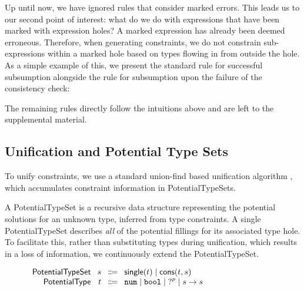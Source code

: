 Up until now, we have ignored rules that consider marked errors. This leads us to our second point of interest: what do we do with expressions that have been marked with expression holes? A marked expression has already been deemed erroneous. Therefore, when generating constraints, we do not constrain sub-expressions within a marked hole based on types flowing in from outside the hole. As a simple example of this, we present the standard rule for successful subsumption alongside the rule for subsumption upon the failure of the consistency check:

\begin{mathpar}
  
\end{mathpar}

The remaining rules directly follow the intuitions above and are left to the supplemental material.

\subsection{Unification and Potential Type Sets}
\label{sec:unification}

To unify constraints, we use a standard union-find based unification algorithm \cite{Huet, GradualInfer}, which accumulates constraint information in \textsf{PotentialTypeSet}s.

A \textsf{PotentialTypeSet} is a recursive data structure representing the potential solutions for an unknown type, inferred from type constraints. A single \textsf{PotentialTypeSet} describes \emph{all} of the potential fillings for its associated type hole. To facilitate this, rather than  substituting types during unification, which results in a loss of information, we continuously extend the \textsf{PotentialTypeSet}.

\begin{figure}[hbt!]
\centering
$\arraycolsep=4pt\begin{array}{rrcl}
\textsf{PotentialTypeSet} & s & \Coloneqq & \textsf{single}(t) \mid \textsf{cons}(t, s) \\
\textsf{PotentialType}    & t & \Coloneqq & \tnum \mid \tbool \mid \tehole^p \mid \tarr{s}{s}
\end{array}$
\label{fig:syntax_possible_type_sets}
\end{figure}

